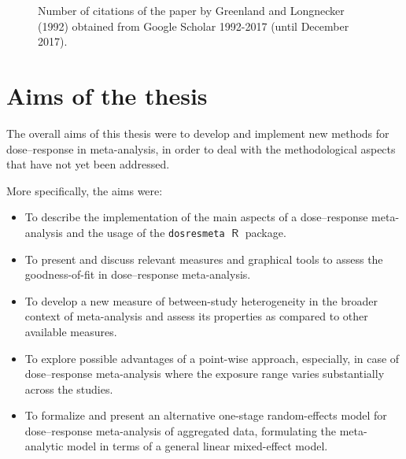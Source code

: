 \documentclass[11pt,a4paper,twoside,openany]{book}\usepackage{knitr}
\DeclareMathOperator{\R}{\textsf{R}}
\begin{document}
{\begin{knitrout}
\begin{figure}[ht!]
{}

\caption[Number of citations of the paper by Greenland and Longnecker (1992) obtained from Google Scholar 1992-2017 (until December 2017)]{Number of citations of the paper by Greenland and Longnecker (1992) obtained from Google Scholar 1992-2017 (until December 2017).}\label{fig:cite_grl}
\end{figure}


\end{knitrout}




%

\chapter{Aims of the thesis}

The overall aims of this thesis were to develop and implement new methods for dose--response in meta-analysis, in order to deal with the methodological aspects that have not yet been addressed.

\bigskip

More specifically, the aims were:

\begin{itemize}
\item To describe the implementation of the main aspects of a dose--response meta-analysis and the usage of the \texttt{dosresmeta} $\R$ package.

\item To present and discuss relevant measures and graphical tools to assess the goodness-of-fit in dose--response meta-analysis.

\item To develop a new measure of between-study heterogeneity in the broader context of meta-analysis and assess its properties as compared to other available measures. 

\item To explore possible advantages of a point-wise approach, especially, in case of dose--response meta-analysis where the exposure range varies substantially across the studies.

\item To formalize and present an alternative one-stage random-effects model for dose--response meta-analysis of aggregated data, formulating the meta-analytic model in terms of a general linear mixed-effect model. 


\end{itemize}}
\end{document}
